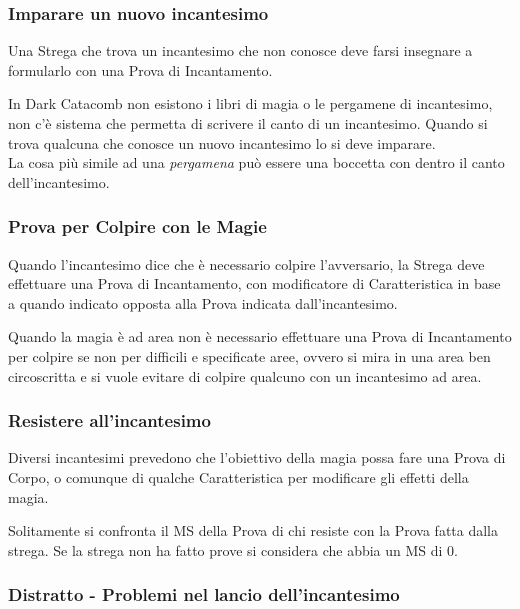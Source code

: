 \documentclass[12pt,a4paper,twoside,openany]{book}
\begin{document}
\begin{multicols}{2}
\subsubsection{Imparare un nuovo incantesimo}

Una Strega che trova un incantesimo che non conosce deve farsi insegnare a formularlo con una Prova di Incantamento.

\begin{narratore}
	In Dark Catacomb non esistono i libri di magia o le pergamene di incantesimo, non c'è sistema che permetta di scrivere il canto di un incantesimo. Quando si trova qualcuna che conosce un nuovo incantesimo lo si deve imparare.\\
	La cosa più simile ad una \textit{pergamena} può essere una boccetta con dentro il canto dell'incantesimo.
\end{narratore}

\subsubsection{Prova per Colpire con le Magie}\label{magietiropercolpireconlemagie}

Quando l'incantesimo dice che è necessario colpire l'avversario, la Strega deve effettuare una Prova di Incantamento, con modificatore di Caratteristica in base a quando indicato opposta alla Prova indicata dall'incantesimo.

\medskip

Quando la magia è ad area non è necessario effettuare una Prova di Incantamento per colpire se non per difficili e specificate aree, ovvero si mira in una area ben circoscritta e si vuole evitare di colpire qualcuno con un incantesimo ad area.

\subsubsection{Resistere all'incantesimo}

Diversi incantesimi prevedono che l'obiettivo della magia possa fare una Prova di Corpo, o comunque di qualche Caratteristica per modificare gli effetti della magia.

Solitamente si confronta il MS della Prova di chi resiste con la Prova fatta dalla strega. Se la strega non ha fatto prove si considera che abbia un MS di 0.

\subsubsection{Distratto - Problemi nel lancio dell'incantesimo}\label{magiedistratto}


\end{multicols}
\end{document}
